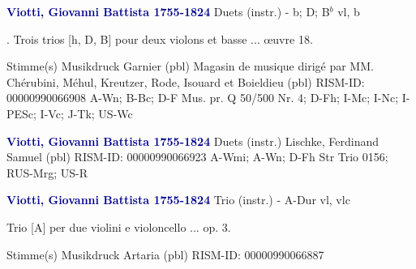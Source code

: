 \documentclass[twocolumn]{book}
\begin{document}
\newline \par \vspace{7pt} \textcolor{darkblue}{\textbf{Viotti, Giovanni Battista  1755-1824}}
\newline Duets (instr.) - b; D; B$^b$
 vl, b
\newline \begin{itshape}. Trois trios [h, D, B] pour deux violons et basse ... œuvre 18.\end{itshape} 
\newline \textcolor{darkblue}{}  Stimme(s)
\newline Musikdruck
\newline Garnier  (pbl)
\newline Magasin de musique dirigé par MM. Chérubini, Méhul, Kreutzer, Rode, Isouard et Boieldieu  (pbl)
\newline RISM-ID: 00000990066908
\newline A-Wn; B-Bc; D-F  Mus. pr. Q 50/500 Nr. 4; D-Fh; I-Mc; I-Nc; I-PESc; I-Vc; J-Tk; US-Wc
\newline \par \vspace{7pt} \textcolor{darkblue}{\textbf{Viotti, Giovanni Battista  1755-1824}}
\newline Duets (instr.)
\newline Lischke, Ferdinand Samuel  (pbl)
\newline RISM-ID: 00000990066923
\newline A-Wmi; A-Wn; D-Fh  Str Trio 0156; RUS-Mrg; US-R
\newline \par \vspace{7pt} \textcolor{darkblue}{\textbf{Viotti, Giovanni Battista  1755-1824}}
\newline Trio (instr.) - A-Dur
 vl, vlc
\newline \begin{itshape}Trio [A] per due violini e violoncello ... op. 3.\end{itshape} 
\newline \textcolor{darkblue}{}  Stimme(s)
\newline Musikdruck
\newline Artaria  (pbl)
\newline RISM-ID: 00000990066887
\end{document}
